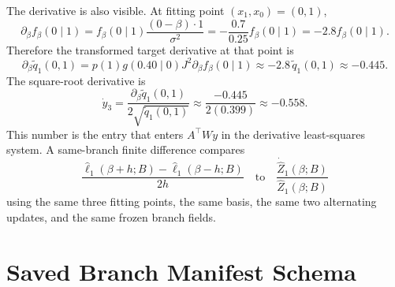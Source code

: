 \documentclass[11pt]{article}
\numberwithin{equation}{section}
\begin{document}
The derivative is also visible.  At fitting point \((x_1,x_0)=(0,1)\),
\begin{equation}
    \partial_\beta f_\beta(0\mid1)
    =
    f_\beta(0\mid1)\frac{(0-\beta)\cdot1}{\sigma^2}
    =
    -\frac{0.7}{0.25}f_\beta(0\mid1)
    =
    -2.8 f_\beta(0\mid1).
    \label{eq:p25-trace2-17}
\end{equation}
Therefore the transformed target derivative at that point is
\begin{equation}
    \partial_\beta\widetilde q_1(0,1)
    =
    p(1)g(0.40\mid0)J^2\partial_\beta f_\beta(0\mid1)
    \approx
    -2.8\,\widetilde q_1(0,1)
    \approx
    -0.445.
    \label{eq:p25-trace2-18}
\end{equation}
The square-root derivative is
\begin{equation}
    \dot y_3
    =
    \frac{\partial_\beta\widetilde q_1(0,1)}
    {2\sqrt{\widetilde q_1(0,1)}}
    \approx
    \frac{-0.445}{2(0.399)}
    \approx
    -0.558.
    \label{eq:p25-trace2-19}
\end{equation}
This number is the entry that enters \(A^\top W\dot y\) in the derivative
least-squares system.  A same-branch finite difference compares
\begin{equation}
    \frac{\widehat\ell_1(\beta+h;B)-\widehat\ell_1(\beta-h;B)}{2h}
    \quad\text{to}\quad
    \frac{\dot{\widehat Z}_1(\beta;B)}{\widehat Z_1(\beta;B)}
    \label{eq:p25-trace2-20}
\end{equation}
using the same three fitting points, the same basis, the same two alternating
updates, and the same frozen branch fields.

\section{Saved Branch Manifest Schema}
\end{document}
